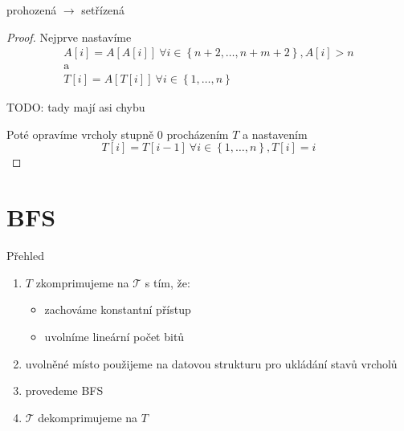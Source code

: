 \documentclass[czech]{beamer}
\begin{document}
	\begin{frame}{prohozená $\rightarrow$ setřízená}
		\begin{proof}
			Nejprve nastavíme 
			\begin{gather*}
				A[i] = A[A[i]]\ \forall i \in \left\{n + 2, \ldots, n + m + 2\right\}, A[i] > n \\
				\text{a} \\
				T[i] = A[T[i]]\ \forall i \in \left\{1, \ldots, n\right\}
			\end{gather*}

			TODO: tady mají asi chybu

			Poté opravíme vrcholy stupně $0$ procházením $T$ a nastavením
			$$T[i] = T[i - 1]\ \forall i \in \left\{1, \ldots, n\right\}, T[i] = i$$

		\end{proof}
	\end{frame}

	\section{BFS}
	\begin{frame}{Přehled}
		\begin{enumerate}
			\item $T$ zkomprimujeme na $\mathcal{T}$ s tím, že:
			\begin{itemize}
				\item zachováme konstantní přístup
				\item uvolníme lineární počet bitů
			\end{itemize}
			\item uvolněné místo použijeme na datovou strukturu pro ukládání stavů vrcholů
			\item provedeme BFS
			\item $\mathcal{T}$ dekomprimujeme na $T$
		\end{enumerate}
	\end{frame}
\end{document}
